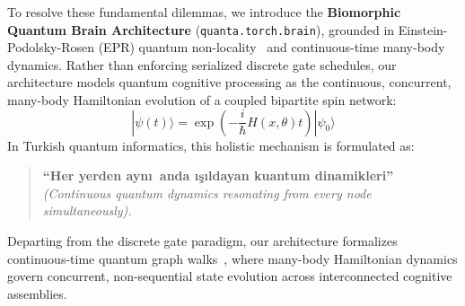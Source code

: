 \documentclass[10pt,twocolumn,3p]{article}
\begin{document}
To resolve these fundamental dilemmas, we introduce the \textbf{Biomorphic Quantum Brain Architecture} (\texttt{quanta.torch.brain}), grounded in Einstein-Podolsky-Rosen (EPR) quantum non-locality~\cite{epr1935} and continuous-time many-body dynamics. Rather than enforcing serialized discrete gate schedules, our architecture models quantum cognitive processing as the continuous, concurrent, many-body Hamiltonian evolution of a coupled bipartite spin network:
\begin{equation}
    |\psi(t)\rangle = \exp\left( -\frac{i}{\hbar} H(x, \theta) t \right) |\psi_0\rangle
\end{equation}
In Turkish quantum informatics, this holistic mechanism is formulated as:
\begin{quote}
    \textbf{``Her yerden ayn\i\ anda \i\c{s}\i ldayan kuantum dinamikleri''} \\
    \textit{(Continuous quantum dynamics resonating from every node simultaneously).}
\end{quote}
Departing from the discrete gate paradigm, our architecture formalizes continuous-time quantum graph walks~\cite{farhi1998}, where many-body Hamiltonian dynamics govern concurrent, non-sequential state evolution across interconnected cognitive assemblies.
\end{document}
